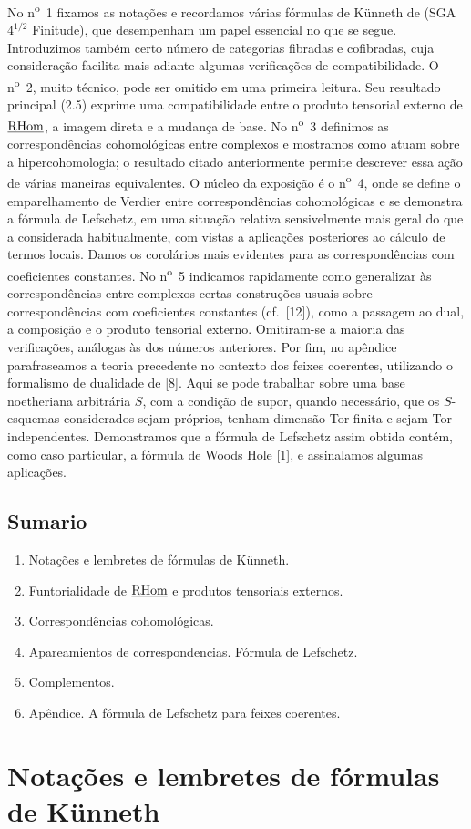 No n\textsuperscript{o}~1 fixamos as notações e recordamos várias fórmulas de Künneth de (SGA~$4^{1/2}$ Finitude), que desempenham um papel essencial no que se segue. Introduzimos também certo número de categorias fibradas e cofibradas, cuja consideração facilita mais adiante algumas verificações de compatibilidade. O n\textsuperscript{o}~2, muito técnico, pode ser omitido em uma primeira leitura. Seu resultado principal (2.5) exprime uma compatibilidade entre o produto tensorial externo de $\underline{\mathrm{RHom}}$, a imagem direta e a mudança de base. No n\textsuperscript{o}~3 definimos as correspondências cohomológicas entre complexos e mostramos como atuam sobre a hipercohomologia; o resultado citado anteriormente permite descrever essa ação de várias maneiras equivalentes. O núcleo da exposição é o n\textsuperscript{o}~4, onde se define o emparelhamento de Verdier entre correspondências cohomológicas e se demonstra a fórmula de Lefschetz, em uma situação relativa sensivelmente mais geral do que a considerada habitualmente, com vistas a aplicações posteriores ao cálculo de termos locais. Damos os corolários mais evidentes para as correspondências com coeficientes constantes. No n\textsuperscript{o}~5 indicamos rapidamente como generalizar às correspondências entre complexos certas construções usuais sobre correspondências com coeficientes constantes (cf.~[12]), como a passagem ao dual, a composição e o produto tensorial externo. Omitiram-se a maioria das verificações, análogas às dos números anteriores. Por fim, no apêndice parafraseamos a teoria precedente no contexto dos feixes coerentes, utilizando o formalismo de dualidade de [8]. Aqui se pode trabalhar sobre uma base noetheriana arbitrária $S$, com a condição de supor, quando necessário, que os $S$-esquemas considerados sejam próprios, tenham dimensão Tor finita e sejam Tor-independentes. Demonstramos que a fórmula de Lefschetz assim obtida contém, como caso particular, a fórmula de Woods Hole [1], e assinalamos algumas aplicações.

\subsection*{Sumario}
\begin{enumerate}[label=\arabic*.]
\item Notações e lembretes de fórmulas de Künneth.
\item Funtorialidade de $\underline{\mathrm{RHom}}$ e produtos tensoriais externos.
\item Correspondências cohomológicas.
\item Apareamientos de correspondencias. Fórmula de Lefschetz.
\item Complementos.
\item Apêndice. A fórmula de Lefschetz para feixes coerentes.
\end{enumerate}

\setcounter{section}{0}%
\section{Notações e lembretes de fórmulas de Künneth}
